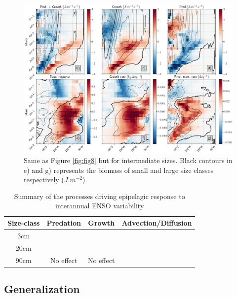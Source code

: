 \begin{figure}[h!tp]
	\centering
	\includegraphics[scale=0.4]{figs/fig9.png}	
	\caption{Same as Figure \ref{fig:fig8} but for intermediate sizes. Black contours in e) and g) represents the biomass of small and large size classes respectively ($J.m^{-2}$).}
	\label{fig:fig9}
\end{figure}



\begin{table}[]
    \centering
    \begin{tabular}{c c c c}
         Size-class & Predation & Growth & Advection/Diffusion \\
            \hline 
            \hline
         3cm & & & \\
         20cm & & & \\
         90cm & No effect & No effect & \\
    \end{tabular}
    \caption{Summary of the processes driving epipelagic response to interannual ENSO variability}
    \label{tab:summary-processes}
\end{table}


\subsection{Generalization}

